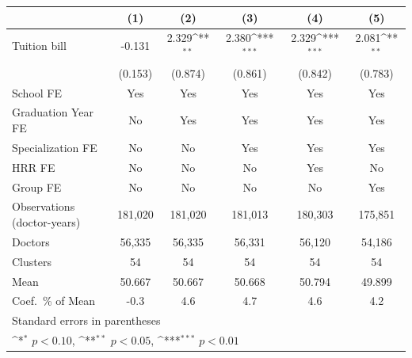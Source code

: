 {
\def\sym#1{\ifmmode^{#1}\else\(^{#1}\)\fi}
\begin{tabular}{l*{5}{c}}
\hline\hline
                    &\multicolumn{1}{c}{(1)}         &\multicolumn{1}{c}{(2)}         &\multicolumn{1}{c}{(3)}         &\multicolumn{1}{c}{(4)}         &\multicolumn{1}{c}{(5)}         \\
\hline
Tuition bill        &      -0.131         &       2.329\sym{**} &       2.380\sym{***}&       2.329\sym{***}&       2.081\sym{**} \\
                    &     (0.153)         &     (0.874)         &     (0.861)         &     (0.842)         &     (0.783)         \\
[1em]
School FE           &         Yes         &         Yes         &         Yes         &         Yes         &         Yes         \\
[1em]
Graduation Year FE  &          No         &         Yes         &         Yes         &         Yes         &         Yes         \\
[1em]
Specialization FE   &          No         &          No         &         Yes         &         Yes         &         Yes         \\
[1em]
HRR FE              &          No         &          No         &          No         &         Yes         &          No         \\
[1em]
Group FE            &          No         &          No         &          No         &          No         &         Yes         \\
\hline
Observations (doctor-years)&     181,020         &     181,020         &     181,013         &     180,303         &     175,851         \\
Doctors             &      56,335         &      56,335         &      56,331         &      56,120         &      54,186         \\
Clusters            &          54         &          54         &          54         &          54         &          54         \\
Mean                &      50.667         &      50.667         &      50.668         &      50.794         &      49.899         \\
Coef.\ \% of Mean   &        -0.3         &         4.6         &         4.7         &         4.6         &         4.2         \\
\hline\hline
\multicolumn{6}{l}{\footnotesize Standard errors in parentheses}\\
\multicolumn{6}{l}{\footnotesize \sym{*} \(p<0.10\), \sym{**} \(p<0.05\), \sym{***} \(p<0.01\)}\\
\end{tabular}
}
